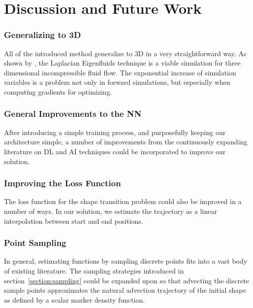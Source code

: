 \chapter{Discussion and Future Work}


\subsection*{Generalizing to 3D}
All of the introduced method generalize to 3D in a very straightforward way. As
shown by \cite{scalable-eigenfluids}, the Laplacian Eigenfluids technique is
a viable simulation for three dimensional incompressible fluid flow. The
exponential increase of simulation variables is a problem not only in forward
simulations, but especially when computing gradients for optimizing. 

\subsection*{General Improvements to the NN}
After introducing a simple training process, and purposefully keeping our
architecture simple, a number of improvements from the continuously expanding
literature on \ac{DL} and \ac{AI} techniques could be incorporated to improve
our solution.

\subsection*{Improving the Loss Function}
The loss function for the shape transition problem could also be improved in
a number of ways. In our solution, we estimate the trajectory as a linear
interpolation between start and end positions. \

\subsection*{Point Sampling}
In general, estimating functions by sampling discrete points fits into a vast
body of existing literature. The sampling strategies introduced in
section~\ref{section:sampling} could be expanded upon so that advecting the
discrete sample points approximates the natural advection trajectory of the
initial shape as defined by a scalar marker density function.


